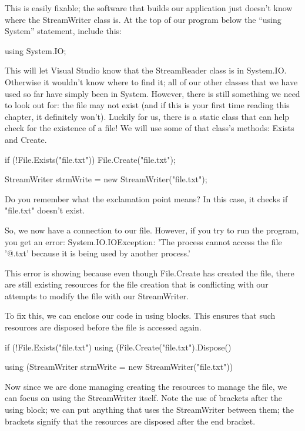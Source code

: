 \documentclass[oneside, openany] {book}
\begin{document}
This is easily fixable; the software that builds our application just doesn’t know where the StreamWriter class is. At the top of our program below the “using System” statement, include this:
\begin{CSharp}
using System.IO;
\end{CSharp}

This will let Visual Studio know that the StreamReader class is in System.IO. Otherwise it wouldn't know where to find it; all of our other classes that we have used so far have simply been in System.  
However, there is still something we need to look out for: the file may not exist (and if this is your first time reading this chapter, it definitely won’t). Luckily for us, there is a static class that can help check for the existence of a file! We will use some of that class’s methods: Exists and Create.
\begin{CSharp}
if (!File.Exists("file.txt"))
{
     File.Create("file.txt");
}

StreamWriter strmWrite = new StreamWriter("file.txt");

\end{CSharp}


Do you remember what the exclamation point means? In this case, it checks if "file.txt" doesn't exist.

So, we now have a connection to our file. However, if you try to run the program, you get an error: System.IO.IOException: 'The process cannot access the file '@.txt' because it is being used by another process.'

This error is showing because even though File.Create has created the file, there are still existing resources for the file creation that is conflicting with our attempts to modify the file with our StreamWriter.

To fix this, we can enclose our code in using blocks. This ensures that such resources are disposed before the file is accessed again.
\begin{CSharp}

if (!File.Exists("file.txt")
{
  using (File.Create("file.txt").Dispose(){}
}

using (StreamWriter strmWrite = new StreamWriter("file.txt"))
{}
\end{CSharp}
Now since we are done managing creating the resources to manage the file, we can focus on using the StreamWriter itself. Note the use of brackets after the using block; we can put anything that uses the StreamWriter between them; the brackets signify that the resources are disposed after the end bracket.
\end{document}
